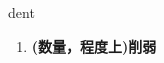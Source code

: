 
\begin{frame}
{\huge dent}
\begin{center}
\begin{enumerate}\Large
  \item \textbf{(数量，程度上)削弱}
\end{enumerate}
\end{center}
\end{frame}
